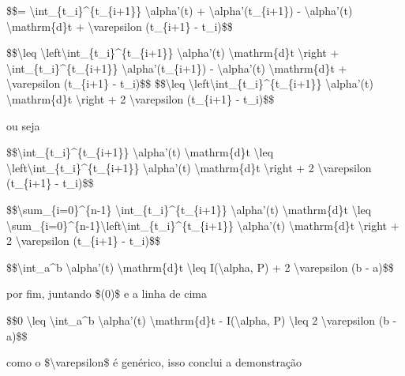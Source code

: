 \$\$= \textbackslash{}int\_\{t\_i\}\^{}\{t\_\{i+1\}\}
\textbar{}\textbackslash{}alpha'(t) + \textbackslash{}alpha'(t\_\{i+1\})
- \textbackslash{}alpha'(t)\textbar{} \textbackslash{}mathrm\{d\}t +
\textbackslash{}varepsilon (t\_\{i+1\} - t\_i)\$\$

\$\$\textbackslash{}leq
\textbackslash{}left\textbar{}\textbackslash{}int\_\{t\_i\}\^{}\{t\_\{i+1\}\}
\textbackslash{}alpha'(t) \textbackslash{}mathrm\{d\}t
\textbackslash{}right\textbar{} +
\textbackslash{}int\_\{t\_i\}\^{}\{t\_\{i+1\}\}
\textbar{}\textbackslash{}alpha'(t\_\{i+1\}) -
\textbackslash{}alpha'(t)\textbar{} \textbackslash{}mathrm\{d\}t +
\textbackslash{}varepsilon (t\_\{i+1\} - t\_i)\$\$
\$\$\textbackslash{}leq
\textbackslash{}left\textbar{}\textbackslash{}int\_\{t\_i\}\^{}\{t\_\{i+1\}\}
\textbackslash{}alpha'(t) \textbackslash{}mathrm\{d\}t
\textbackslash{}right\textbar{} + 2 \textbackslash{}varepsilon
(t\_\{i+1\} - t\_i)\$\$

ou seja

\$\$\textbackslash{}int\_\{t\_i\}\^{}\{t\_\{i+1\}\}
\textbar{}\textbackslash{}alpha'(t)\textbar{}
\textbackslash{}mathrm\{d\}t \textbackslash{}leq
\textbackslash{}left\textbar{}\textbackslash{}int\_\{t\_i\}\^{}\{t\_\{i+1\}\}
\textbackslash{}alpha'(t) \textbackslash{}mathrm\{d\}t
\textbackslash{}right\textbar{} + 2 \textbackslash{}varepsilon
(t\_\{i+1\} - t\_i)\$\$

\$\$\textbackslash{}sum\_\{i=0\}\^{}\{n-1\}
\textbackslash{}int\_\{t\_i\}\^{}\{t\_\{i+1\}\}
\textbar{}\textbackslash{}alpha'(t)\textbar{}
\textbackslash{}mathrm\{d\}t \textbackslash{}leq
\textbackslash{}sum\_\{i=0\}\^{}\{n-1\}\textbackslash{}left\textbar{}\textbackslash{}int\_\{t\_i\}\^{}\{t\_\{i+1\}\}
\textbackslash{}alpha'(t) \textbackslash{}mathrm\{d\}t
\textbackslash{}right\textbar{} + 2 \textbackslash{}varepsilon
(t\_\{i+1\} - t\_i)\$\$

\$\$\textbackslash{}int\_a\^{}b
\textbar{}\textbackslash{}alpha'(t)\textbar{}
\textbackslash{}mathrm\{d\}t \textbackslash{}leq
I(\textbackslash{}alpha, P) + 2 \textbackslash{}varepsilon (b - a)\$\$

por fim, juntando \$(0)\$ e a linha de cima

\$\$0 \textbackslash{}leq \textbackslash{}int\_a\^{}b
\textbar{}\textbackslash{}alpha'(t)\textbar{}
\textbackslash{}mathrm\{d\}t - I(\textbackslash{}alpha, P)
\textbackslash{}leq 2 \textbackslash{}varepsilon (b - a)\$\$

como o \$\textbackslash{}varepsilon\$ é genérico, isso conclui a
demonstração

